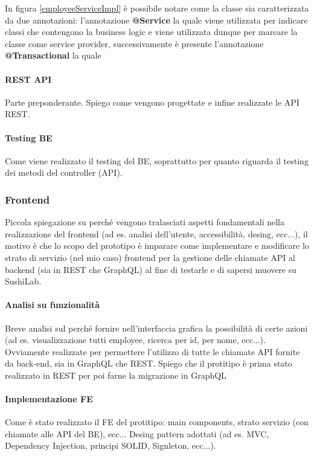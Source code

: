 \FloatBarrier
In figura \ref{employeeServiceImpl} è possibile notare come la classe sia caratterizzata da due annotazioni: l'annotazione \textbf{@Service} la quale viene utilizzata per indicare classi che contengono la business logic e viene utilizzata dunque per marcare la classe come service provider, successivamente è presente l'annotazione \textbf{@Transactional} la quale



\paragraph{REST API}
Parte preponderante. Spiego come vengono progettate e infine realizzate le API REST.
\paragraph{Testing BE}
Come viene realizzato il testing del BE, soprattutto per quanto riguarda il testing dei metodi del controller (API).

\subsubsection*{Frontend}
Piccola spiegazione su perché vengono tralasciati aspetti fondamentali nella realizzazione del frontend (ad es. analisi dell'utente, accessibilità, desing, ecc...), il motivo è che lo scopo del prototipo è imparare come implementare e modificare lo strato di servizio (nel mio caso) frontend per la gestione delle chiamate API al backend (sia in REST che GraphQL) al fine di testarle e di sapersi muovere su SushiLab.
\paragraph{Analisi su funzionalità}
Breve analisi sul perché fornire nell'interfaccia grafica la possibilità di certe azioni (ad es. visualizzazione tutti employee, ricerca per id, per nome, ecc...). Ovviamente realizzate per permettere l'utilizzo di tutte le chiamate API fornite da back-end, sia in GraphQL che REST. Spiego che il protitipo è prima stato realizzato in REST per poi farne la migrazione in GraphQL
\paragraph{Implementazione FE}
Come è stato realizzato il FE del protitipo: main components, strato servizio (con chiamate alle API del BE), ecc...
Desing pattern adottati (ad es. MVC, Dependency Injection, principi SOLID, Signleton, ecc...).
